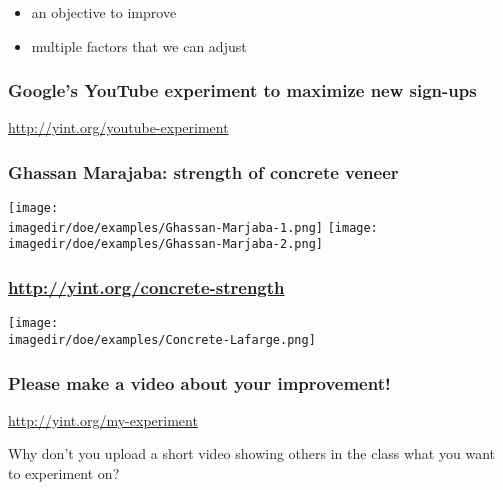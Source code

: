\begin{frame}\frametitle{}
	\begin{itemize}
		\item	\LARGE an {\color{purple}objective} to improve
		\item	\LARGE multiple {\color{purple}factors} that we can adjust
	\end{itemize}
\end{frame}

\begin{frame}\frametitle{Google's YouTube experiment to maximize new sign-ups}
	\begin{center}
		\Huge{\href{http://yint.org/youtube-experiment}{http://yint.org/youtube-experiment}}
	\end{center}	
\end{frame}

\begin{frame}\frametitle{Ghassan Marajaba: strength of concrete veneer}
	\begin{center}
		\texttt{[image: \\imagedir/doe/examples/Ghassan-Marjaba-1.png]}
		\texttt{[image: \\imagedir/doe/examples/Ghassan-Marjaba-2.png]}
	\end{center}
\end{frame}

\begin{frame}\frametitle{\href{http://yint.org/concrete-strength}{http://yint.org/concrete-strength}}
	\begin{center}
		\texttt{[image: \\imagedir/doe/examples/Concrete-Lafarge.png]}
	\end{center}
\end{frame}

\begin{frame}\frametitle{Please make a video about your improvement!}
	{\Huge \href{http://yint.org/my-experiment}{http://yint.org/my-experiment}
	
	\vspace{24pt}	
	Why don't you upload a short video showing others in the class what you want to experiment on?	
	}
\end{frame}
